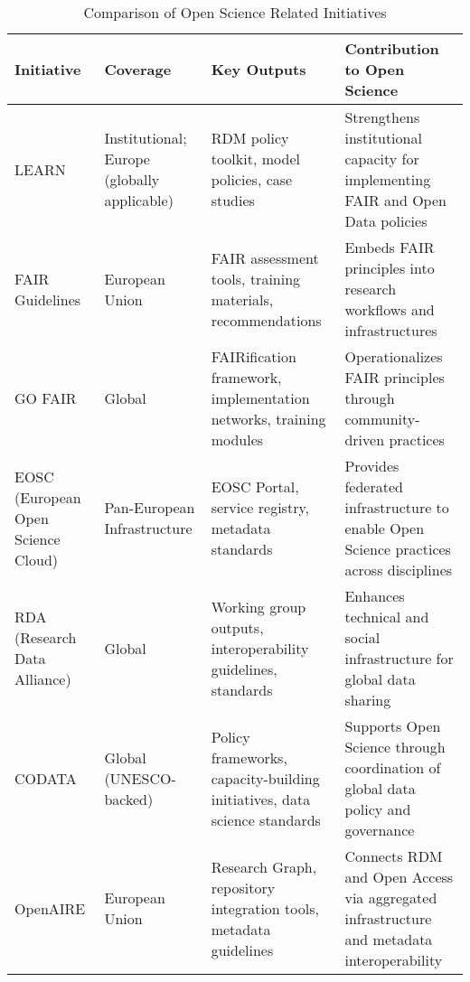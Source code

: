 \documentclass{article}
\begin{document}
\begin{table}[H]
    \centering
    \caption{Comparison of Open Science Related Initiatives}
    \label{tab:initiative_comparison}
    \begin{tabularx}{\textwidth}{|X|X|X|X|}
        \hline
        \textbf{Initiative}                & \textbf{Coverage}                           & \textbf{Key Outputs}                                                     & \textbf{Contribution to Open Science}                                                    \\
        \hline
        LEARN                              & Institutional; Europe (globally applicable) & RDM policy toolkit, model policies, case studies                         & Strengthens institutional capacity for implementing FAIR and Open Data policies          \\
        \hline
        FAIR Guidelines                    & European Union                              & FAIR assessment tools, training materials, recommendations               & Embeds FAIR principles into research workflows and infrastructures                       \\
        \hline
        GO FAIR                            & Global                                      & FAIRification framework, implementation networks, training modules       & Operationalizes FAIR principles through community-driven practices                       \\
        \hline
        EOSC (European Open Science Cloud) & Pan-European Infrastructure                 & EOSC Portal, service registry, metadata standards                        & Provides federated infrastructure to enable Open Science practices across disciplines    \\
        \hline
        RDA (Research Data Alliance)       & Global                                      & Working group outputs, interoperability guidelines, standards            & Enhances technical and social infrastructure for global data sharing                     \\
        \hline
        CODATA                             & Global (UNESCO-backed)                      & Policy frameworks, capacity-building initiatives, data science standards & Supports Open Science through coordination of global data policy and governance          \\
        \hline
        OpenAIRE                           & European Union                              & Research Graph, repository integration tools, metadata guidelines        & Connects RDM and Open Access via aggregated infrastructure and metadata interoperability \\
        \hline
    \end{tabularx}
\end{table}
\end{document}

